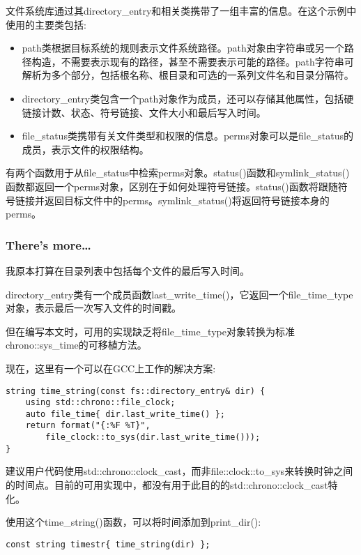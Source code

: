 文件系统库通过其directory\_entry和相关类携带了一组丰富的信息。在这个示例中使用的主要类包括:

\begin{itemize}
\item 
path类根据目标系统的规则表示文件系统路径。path对象由字符串或另一个路径构造，不需要表示现有的路径，甚至不需要表示可能的路径。path字符串可解析为多个部分，包括根名称、根目录和可选的一系列文件名和目录分隔符。

\item 
directory\_entry类包含一个path对象作为成员，还可以存储其他属性，包括硬链接计数、状态、符号链接、文件大小和最后写入时间。

\item 
file\_status类携带有关文件类型和权限的信息。perms对象可以是file\_status的成员，表示文件的权限结构。
\end{itemize}

有两个函数用于从file\_status中检索perms对象。status()函数和symlink\_status()函数都返回一个perms对象，区别在于如何处理符号链接。status()函数将跟随符号链接并返回目标文件中的perms。symlink\_status()将返回符号链接本身的perms。

\subsubsection{There's more…}

我原本打算在目录列表中包括每个文件的最后写入时间。

directory\_entry类有一个成员函数last\_write\_time()，它返回一个file\_time\_type对象，表示最后一次写入文件的时间戳。

但在编写本文时，可用的实现缺乏将file\_time\_type对象转换为标准chrono::sys\_time的可移植方法。

现在，这里有一个可以在GCC上工作的解决方案:

\begin{lstlisting}[style=styleCXX]
string time_string(const fs::directory_entry& dir) {
	using std::chrono::file_clock;
	auto file_time{ dir.last_write_time() };
	return format("{:%F %T}",
		file_clock::to_sys(dir.last_write_time()));
}
\end{lstlisting}

建议用户代码使用std::chrono::clock\_cast，而非file::clock::to\_sys来转换时钟之间的时间点。目前的可用实现中，都没有用于此目的的std::chrono::clock\_cast特化。

使用这个time\_string()函数，可以将时间添加到print\_dir():

\begin{lstlisting}[style=styleCXX]
const string timestr{ time_string(dir) };
\end{lstlisting}


